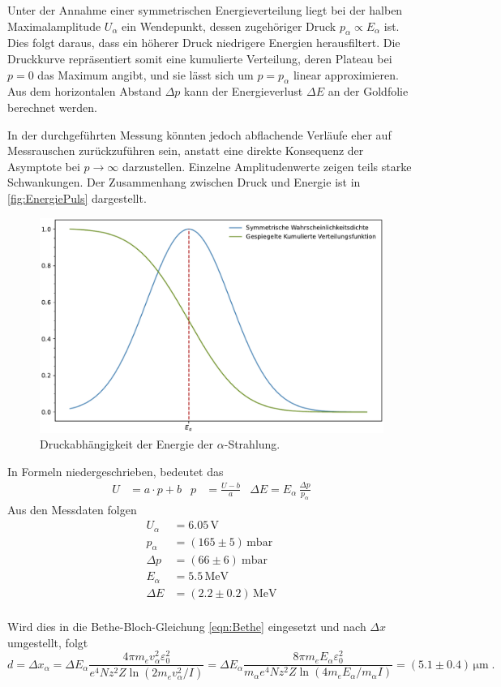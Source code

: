 Unter der Annahme einer symmetrischen Energieverteilung liegt bei der halben Maximalamplitude $U_\alpha$ ein Wendepunkt,  
dessen zugehöriger Druck $p_\alpha \propto E_\alpha$ ist. Dies folgt daraus, dass ein höherer Druck niedrigere Energien herausfiltert.  
Die Druckkurve repräsentiert somit eine kumulierte Verteilung, deren Plateau bei $p = 0$ das Maximum angibt, und sie lässt sich um $p = p_\alpha$ linear approximieren.  
Aus dem horizontalen Abstand $\Delta p$ kann der Energieverlust $\Delta E$ an der Goldfolie berechnet werden.  

In der durchgeführten Messung könnten jedoch abflachende Verläufe eher auf Messrauschen zurückzuführen sein,  
anstatt eine direkte Konsequenz der Asymptote bei $p \to \infty$ darzustellen. Einzelne Amplitudenwerte zeigen teils starke Schwankungen.  
Der Zusammenhang zwischen Druck und Energie ist in \autoref{fig:EnergiePuls} dargestellt.

\begin{figure}[h!]
    \centering
    \includegraphics[width=1\textwidth]{content/messung/EnergiePuls.pdf}
    \caption{Druckabhängigkeit der Energie der $\alpha$-Strahlung.}
    \label{fig:EnergiePuls}
\end{figure}

In Formeln niedergeschrieben, bedeutet das 
\begin{align*}
U &= a \cdot p + b & p &= \frac{U - b}{a} & \Delta E = E_\alpha \, \frac{\Delta p}{p_\alpha}
\end{align*}
Aus den Messdaten folgen 
\begin{align*}
U_{\alpha} &= 6.05\, \text{V}\\
p_{\alpha} &= (165\pm 5)\, \text{mbar}\\
\Delta p &= (66\pm 6)\ \text{mbar}\\
E_{\alpha} &= 5.5\, \text{MeV}\\
\Delta E &= (2.2\pm 0.2)\, \text{MeV}\\
\end{align*}

Wird dies in die Bethe-Bloch-Gleichung \ref{eqn:Bethe} eingesetzt und nach $\Delta x$ umgestellt, folgt
$$d = \Delta x_\alpha = \Delta E_\alpha \frac{4\pi m_e v_\alpha^2 \varepsilon_0^2}{e^4 N z^2 Z \ln (2m_e v_\alpha^2 / I)}
= \Delta E_\alpha \frac{8\pi m_e E_\alpha \varepsilon_0^2}{m_\alpha e^4 N z^2 Z \ln (4m_e E_\alpha / m_\alpha I)} = (5.1\pm 0.4) \, \unit{\micro \meter}
\; .$$
